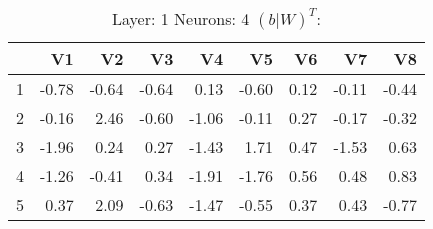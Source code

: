 \begin{table}[ht]
\centering
\begin{tabular}{rrrrrrrrr}
  \hline
 & V1 & V2 & V3 & V4 & V5 & V6 & V7 & V8 \\ 
  \hline
1 & -0.78 & -0.64 & -0.64 & 0.13 & -0.60 & 0.12 & -0.11 & -0.44 \\ 
  2 & -0.16 & 2.46 & -0.60 & -1.06 & -0.11 & 0.27 & -0.17 & -0.32 \\ 
  3 & -1.96 & 0.24 & 0.27 & -1.43 & 1.71 & 0.47 & -1.53 & 0.63 \\ 
  4 & -1.26 & -0.41 & 0.34 & -1.91 & -1.76 & 0.56 & 0.48 & 0.83 \\ 
  5 & 0.37 & 2.09 & -0.63 & -1.47 & -0.55 & 0.37 & 0.43 & -0.77 \\ 
   \hline
\end{tabular}
\caption{Layer: 1 Neurons: 4  $(b|W)^T$: 
} 
\end{table}
